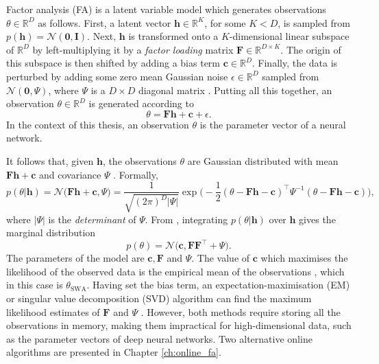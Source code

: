 \documentclass[msc,deptreport.inf]{infthesis} %
\newcommand{\matr}[1]{\mathbf{#1}}
\newcommand{\R}{\mathbb R}
\begin{document}
Factor analysis (FA) is a latent variable model which generates observations $\theta \in \R^D$ as follows. First, a latent vector $\matr{h} \in \R^K$, for some $K < D$, is sampled from $p(\matr{h}) = \mathcal{N}(\matr{0}, \matr{I})$. Next, $\matr{h}$ is transformed onto a $K$-dimensional linear subspace of $\R^D$ by left-multiplying it by a \emph{factor loading} matrix $\matr{F} \in \R^{D \times K}$. The origin of this subspace is then shifted by adding a bias term $\matr{c} \in \R^D$. Finally, the data is perturbed by adding some zero mean Gaussian noise $\epsilon \in \R^D$ sampled from $\mathcal{N}(\matr{0}, \Psi)$, where $\Psi$ is a $D\times D$ diagonal matrix \cite{barber2007}. Putting all this together, an observation $\theta \in \R^D$ is generated according to 
\begin{equation}\label{eqn:fa_model}
	\theta = \matr{Fh} + \matr{c} + \epsilon.
\end{equation}
In the context of this thesis, an observation $\theta$ is the parameter vector of a neural network. 

It follows that, given $\matr{h}$, the observations $\theta$ are Gaussian distributed with mean $\matr{Fh} + \matr{c}$ and covariance $\Psi$ \cite{barber2007}. Formally,
\begin{equation}\label{eqn:fa_cond_dist}
	p(\theta | \matr{h}) 
	= \mathcal{N}\Big( \matr{Fh} + \matr{c}, \Psi \Big)
	= \frac{1}{\sqrt{(2\pi)^D |\Psi|}} 
	\exp \Big(-\frac{1}{2} (\theta - \matr{Fh} - \matr{c})^\intercal \Psi^{-1} (\theta - \matr{Fh} - \matr{c})\Big),
\end{equation}
where $|\Psi|$ is the \emph{determinant} of $\Psi$. From \cite{barber2007}, integrating $p(\theta | \matr{h})$ over $\matr{h}$ gives the marginal distribution
\begin{equation}\label{eqn:fa_marginal_dist}
	p(\theta) = \mathcal{N}\big(\matr{c}, \matr{FF}^{\intercal} + \Psi\big).
\end{equation}
The parameters of the model are $\matr{c}, \matr{F}$ and $\Psi$. The value of $\matr{c}$ which maximises the likelihood of the observed data is the empirical mean of the observations \cite{barber2007}, which in this case is $\theta_{\text{SWA}}$. 
Having set the bias term, an expectation-maximisation (EM) or singular value decomposition (SVD) algorithm can find the maximum likelihood estimates of $\matr{F}$ and $\Psi$ \cite{barber2007}. However, both methods require storing all the observations in memory, making them impractical for high-dimensional data, such as the parameter vectors of deep neural networks. Two alternative online algorithms are presented in Chapter \ref{ch:online_fa}.
\end{document}
